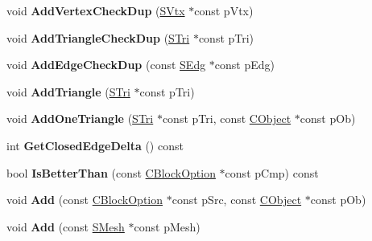 \begin{DoxyCompactItemize}
\item 
\hypertarget{struct_c_block_option_a71ade1bc35ff9ac71291d490d853c01b}{void {\bfseries Add\+Vertex\+Check\+Dup} (\hyperlink{struct_s_vtx}{S\+Vtx} $\ast$const p\+Vtx)}\label{struct_c_block_option_a71ade1bc35ff9ac71291d490d853c01b}

\item 
\hypertarget{struct_c_block_option_a831310b5b1c5078aee76a993a02e64a3}{void {\bfseries Add\+Triangle\+Check\+Dup} (\hyperlink{struct_s_tri}{S\+Tri} $\ast$const p\+Tri)}\label{struct_c_block_option_a831310b5b1c5078aee76a993a02e64a3}

\item 
\hypertarget{struct_c_block_option_afc3c6882cab8c2d7f4778675cdf254e3}{void {\bfseries Add\+Edge\+Check\+Dup} (const \hyperlink{struct_s_edg}{S\+Edg} $\ast$const p\+Edg)}\label{struct_c_block_option_afc3c6882cab8c2d7f4778675cdf254e3}

\item 
\hypertarget{struct_c_block_option_a7b716841aff8eab0bda596d53e964872}{void {\bfseries Add\+Triangle} (\hyperlink{struct_s_tri}{S\+Tri} $\ast$const p\+Tri)}\label{struct_c_block_option_a7b716841aff8eab0bda596d53e964872}

\item 
\hypertarget{struct_c_block_option_aeca42f536a039d5fb6cf956df428a6c8}{void {\bfseries Add\+One\+Triangle} (\hyperlink{struct_s_tri}{S\+Tri} $\ast$const p\+Tri, const \hyperlink{class_c_object}{C\+Object} $\ast$const p\+Ob)}\label{struct_c_block_option_aeca42f536a039d5fb6cf956df428a6c8}

\item 
\hypertarget{struct_c_block_option_ad1d73897562015877f5205485c520a5e}{int {\bfseries Get\+Closed\+Edge\+Delta} () const }\label{struct_c_block_option_ad1d73897562015877f5205485c520a5e}

\item 
\hypertarget{struct_c_block_option_a2da47e867c75e27512d720aadd1de7f3}{bool {\bfseries Is\+Better\+Than} (const \hyperlink{struct_c_block_option}{C\+Block\+Option} $\ast$const p\+Cmp) const }\label{struct_c_block_option_a2da47e867c75e27512d720aadd1de7f3}

\item 
\hypertarget{struct_c_block_option_ab65a8827508789e3c48b3336c3f8d7c5}{void {\bfseries Add} (const \hyperlink{struct_c_block_option}{C\+Block\+Option} $\ast$const p\+Src, const \hyperlink{class_c_object}{C\+Object} $\ast$const p\+Ob)}\label{struct_c_block_option_ab65a8827508789e3c48b3336c3f8d7c5}

\item 
\hypertarget{struct_c_block_option_adc419a8298619330407e8966b540217f}{void {\bfseries Add} (const \hyperlink{struct_s_mesh}{S\+Mesh} $\ast$const p\+Mesh)}\label{struct_c_block_option_adc419a8298619330407e8966b540217f}

\end{DoxyCompactItemize}
